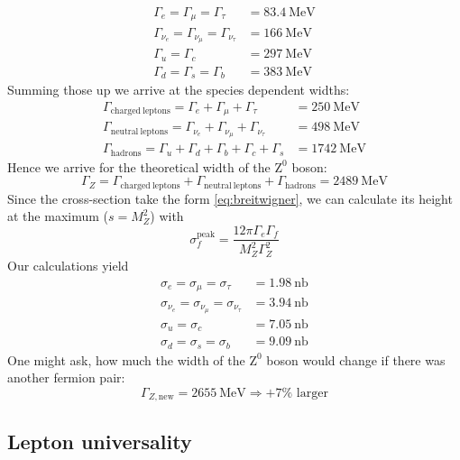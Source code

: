 \begin{align*}
    \Gamma_e = \Gamma_\mu = \Gamma_\tau &= 83.4 \: \mathrm{MeV}   \\
    \Gamma_{\nu_e} = \Gamma_{\nu_\mu} = \Gamma_{\nu_\tau} &= 166 \: \mathrm{MeV}  \\
    \Gamma_u = \Gamma_c &= 297 \: \mathrm{MeV} \\
    \Gamma_d = \Gamma_s = \Gamma_b &= 383 \: \mathrm{MeV} 
\end{align*}
Summing those up we arrive at the species dependent widths:
\begin{align*}
    \Gamma_{\mathrm{charged \: leptons}} = \Gamma_e + \Gamma_\mu + \Gamma_\tau &= 250\: \mathrm{MeV} \\
    \Gamma_{\mathrm{neutral \: leptons}} = \Gamma_{\nu_e} + \Gamma_{\nu_\mu} + \Gamma_{\nu_\tau} &= 498 \: \mathrm{MeV} \\
    \Gamma_{\mathrm{hadrons}} = \Gamma_u + \Gamma_d + \Gamma_b + \Gamma_c + \Gamma_s &= 1742 \: \mathrm{MeV} 
\end{align*}
Hence we arrive for the theoretical width of the $\mathrm{Z^0}$ boson:
\begin{equation*}
    \Gamma_Z = \Gamma_{\mathrm{charged \: leptons}} + \Gamma_{\mathrm{neutral \: leptons}}  + \Gamma_{\mathrm{hadrons}} = 2489 \: \mathrm{MeV}
\end{equation*}
Since the cross-section take the form \eqref{eq:breitwigner}, we can calculate its height at the maximum ($s = M_Z^2$) with
\begin{equation*}
    \sigma_f^{\mathrm{peak}} = \frac{12\pi \Gamma_e \Gamma_f }{M_Z^2 \Gamma_Z^2}
\end{equation*}
Our calculations yield
\begin{align*}
     \label{eq:peaks}
     \sigma_e = \sigma_\mu = \sigma_\tau &= 1.98 \: \mathrm{nb} \\
     \sigma_{\nu_e} = \sigma_{\nu_\mu} = \sigma_{\nu_\tau} &= 3.94 \: \mathrm{nb} \\
     \sigma_u = \sigma_c &= 7.05 \: \mathrm{nb} \\
     \sigma_d = \sigma_s = \sigma_b &= 9.09\: \mathrm{nb} 
    \end{align*}
 One might ask, how much the width of the $\mathrm{Z^0}$ boson would change if there was another fermion pair:
 \begin{equation*}
 \Gamma_{Z, \mathrm{new}} = 2655 \: \mathrm{MeV} \Rightarrow +7\% \text{ larger}
 \end{equation*}
\subsection{Lepton universality}
\label{sub:lepton_universality}

